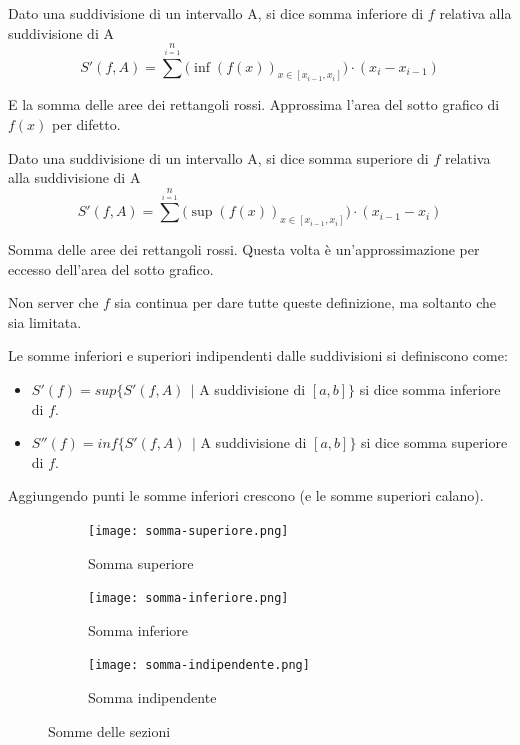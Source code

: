 \begin{definition}
Dato una suddivisione di un intervallo A, si dice somma inferiore di $f$ relativa alla suddivisione di A 
\vspace{-5pt}
\[S'(f,A) = \sum^n\limits_{i=1} \big( \inf(f(x))_{x \in [x_{i-1}, x_i]} \big) \cdot (x_i - x_{i - 1})\]
\end{definition}
E la somma delle aree dei rettangoli rossi. Approssima l'area del sotto grafico di $f(x)$ per difetto.
\begin{definition}
Dato una suddivisione di un intervallo A, si dice somma superiore di $f$ relativa alla suddivisione di A 
\vspace{-5pt}
\[S'(f,A) = \sum^n\limits_{i=1} \big( \sup(f(x))_{x \in [x_{i-1}, x_i]} \big) \cdot (x_{i-1} - x_i)\]
\end{definition}
Somma delle aree dei rettangoli rossi. Questa volta è un'approssimazione per eccesso dell'area del sotto grafico.
\begin{observation}
Non server che $f$ sia continua per dare tutte queste definizione, ma soltanto che sia limitata.
\end{observation}
\begin{definition}
Le somme inferiori e superiori indipendenti dalle suddivisioni si definiscono come:
\begin{itemize}
    \item $S'(f) = sup\{S'(f,A) \:\: |$ A suddivisione di $[a,b]\}$ si dice somma inferiore di $f$.
    \item $S''(f) = inf\{S'(f,A) \:\: |$ A suddivisione di $[a,b]\}$ si dice somma superiore di $f$.
\end{itemize}
\end{definition}
Aggiungendo punti le somme inferiori crescono (e le somme superiori calano).

\begin{figure}[h!]
    \begin{subfigure}{.3\textwidth}
        \centering
        \texttt{[image: somma-superiore.png]}
        \caption{Somma superiore}
    \end{subfigure}
    \begin{subfigure}{.3\textwidth}
        \centering
        \texttt{[image: somma-inferiore.png]}
        \caption{Somma inferiore}
    \end{subfigure}
    \begin{subfigure}{.3\textwidth}
        \centering
        \texttt{[image: somma-indipendente.png]}
        \caption{Somma indipendente}
    \end{subfigure}
    \caption{Somme delle sezioni}
\end{figure}

